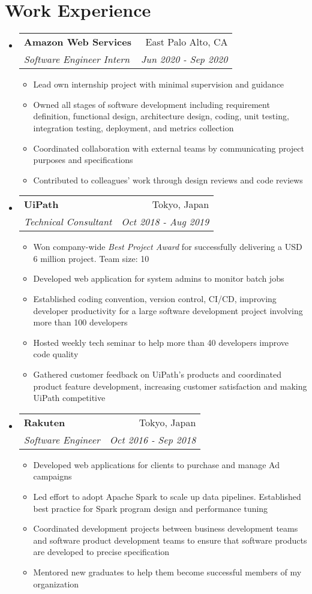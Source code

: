 \documentclass[letterpaper,11pt]{article}
\makeatletter
\newcommand{\bulletItem}[1]{
  \item\small{
    {#1 \vspace{-2pt}}
  }
}
\newcommand{\resumeSubheading}[4]{
  \vspace{-1pt}\item[]
    \begin{tabular*}{0.97\textwidth}[t]{l@{\extracolsep{\fill}}r}
      \textbf{#1} & #2 \\
      \textit{\small#3} & \textit{\small #4} \\
    \end{tabular*}\vspace{-5pt}
}
\newcommand{\resumeSubHeadingListStart}{\begin{itemize}[leftmargin=0pt]}
\newcommand{\resumeSubHeadingListEnd}{\end{itemize}}
\makeatother
\begin{document}
\section{Work Experience}
  \resumeSubHeadingListStart
    \resumeSubheading
    {Amazon Web Services}{East Palo Alto, CA}
    {Software Engineer Intern}{Jun 2020 - Sep 2020}
    \begin{itemize} 
      \bulletItem {Lead own internship project with minimal supervision and guidance}
      \bulletItem {Owned all stages of software development including requirement definition, functional design, architecture design, coding, unit testing, integration testing, deployment, and metrics collection}
      \bulletItem {Coordinated collaboration with external teams by communicating project purposes and specifications}
      \bulletItem {Contributed to colleagues' work through design reviews and code reviews}
    \end{itemize}

    \resumeSubheading
      {UiPath}{Tokyo, Japan}
      {Technical Consultant}{Oct 2018 - Aug 2019}
      \begin{itemize} 
        \bulletItem {Won company-wide \textit{Best Project Award} for successfully delivering a USD 6 million project. Team size: 10}
        \bulletItem {Developed web application for system admins to monitor batch jobs}
        \bulletItem {Established coding convention, version control, CI/CD, improving developer productivity for a large software development project involving more than 100 developers}
        \bulletItem {Hosted weekly tech seminar to help more than 40 developers improve code quality}
        \bulletItem {Gathered customer feedback on UiPath's products and coordinated product feature development, increasing customer satisfaction and making UiPath competitive}
      \end{itemize}

    \resumeSubheading
      {Rakuten}{Tokyo, Japan}
      {Software Engineer}{Oct 2016 - Sep 2018}
      \begin{itemize} 
        \bulletItem {Developed web applications for clients to purchase and manage Ad campaigns}
        \bulletItem {Led effort to adopt Apache Spark to scale up data pipelines. Established best practice for Spark program design and performance tuning}
        \bulletItem {Coordinated development projects between business development teams and software product development teams to ensure that software products are developed to precise specification}
        \bulletItem {Mentored new graduates to help them become successful members of my organization}
      \end{itemize}
  \resumeSubHeadingListEnd
\end{document}
